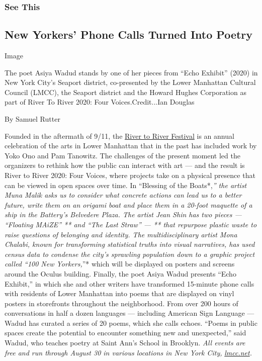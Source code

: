 \hypertarget{see-this}{%
\subsubsection{See This}\label{see-this}}

\hypertarget{new-yorkers-phone-calls-turned-into-poetry}{%
\subsection{New Yorkers' Phone Calls Turned Into
Poetry}\label{new-yorkers-phone-calls-turned-into-poetry}}

Image

The poet Asiya Wadud stands by one of her pieces from ``Echo Exhibit''
(2020) in New York City's Seaport district, co-presented by the Lower
Manhattan Cultural Council (LMCC), the Seaport district and the Howard
Hughes Corporation as part of River To River 2020: Four
Voices.Credit...Ian Douglas

By Samuel Rutter

Founded in the aftermath of 9/11, the
\href{https://www.nytimes3xbfgragh.onion/2019/06/26/arts/dance/river-to-river-festival.html}{River
to River Festival} is an annual celebration of the arts in Lower
Manhattan that in the past has included work by Yoko Ono and Pam
Tanowitz. The challenges of the present moment led the organizers to
rethink how the public can interact with art --- and the result is River
to River 2020: Four Voices, where projects take on a physical presence
that can be viewed in open spaces over time. In ``Blessing of the
Boats*,\emph{'' the artist Muna Malik asks us to consider what concrete
actions can lead us to a better future, write them on an origami boat
and place them in a 20-foot maquette of a ship in the Battery's
Belvedere Plaza. The artist Jean Shin has two pieces --- ``Floating
MAiZE'' ** and ``The Last Straw'' --- ** that repurpose plastic waste to
raise questions of belonging and identity. The multidisciplinary artist
Mona Chalabi, known for transforming statistical truths into visual
narratives, has used census data to condense the city's sprawling
population down to a graphic project called ``100 New Yorkers,}''* which
will be displayed on posters and screens around the Oculus building.
Finally, the poet Asiya Wadud presents ``Echo Exhibit,'' in which she
and other writers have transformed 15-minute phone calls with residents
of Lower Manhattan into poems that are displayed on vinyl posters in
storefronts throughout the neighborhood. From over 200 hours of
conversations in half a dozen languages --- including American Sign
Language --- Wadud has curated a series of 20 poems, which she calls
echoes. ``Poems in public spaces create the potential to encounter
something new and unexpected,'' said Wadud, who teaches poetry at Saint
Ann's School in Brooklyn. \emph{All events are free and run through
August 30 in various locations in New York City,}
\href{https://lmcc.net/river-to-river-festival/}{\emph{lmcc.net}}\emph{.}

